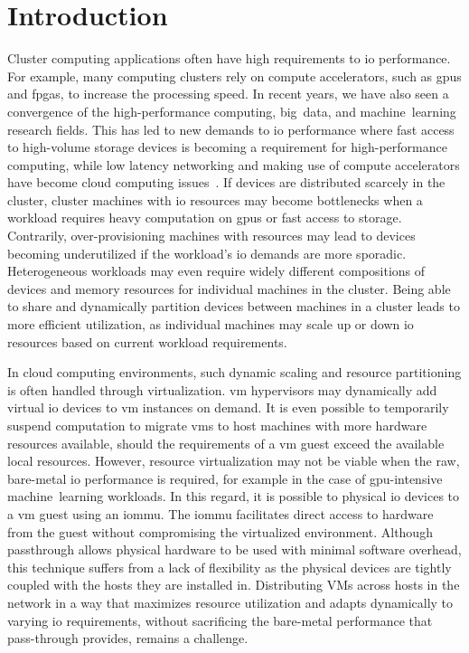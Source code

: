 \chapter{Introduction}\label{chapter:intro}
Cluster computing applications often have high requirements to \gls{io} performance.
%
For example, many computing clusters rely on compute accelerators, such as \glspl{gpu} and \glspl{fpga}, to increase the processing speed.
%
In recent years, we have also seen a convergence of the high-performance computing, big~data, and machine~learning research fields.
%
This has led to new demands to \gls{io} performance where fast access to high-volume storage devices is becoming a requirement for high-performance computing, while low latency networking and making use of compute accelerators have become cloud computing issues~\cite{Trivedi2011,Coates2013,Taherkordi2018}.
%
If devices are distributed scarcely in the cluster, cluster machines with \gls{io} resources may become bottlenecks when a workload requires heavy computation on \glspl{gpu} or fast access to storage.
%
Contrarily, over-provisioning machines with resources may lead to devices becoming underutilized if the workload's \gls{io} demands are more sporadic.
%
Heterogeneous workloads may even require widely different compositions of devices and memory resources for individual machines in the cluster.
%
Being able to share and dynamically partition devices between machines in a cluster leads to more efficient
utilization, as individual machines may scale up or down \gls{io} resources based on current workload requirements.



In cloud computing environments, such dynamic scaling and resource partitioning is often handled through virtualization. 
\Gls{vm} \glspl{hypervisor} may dynamically add virtual \gls{io} devices to \gls{vm} instances on demand.
%
It is even possible to temporarily suspend computation to migrate \glspl{vm} to \gls{host} machines with more hardware resources available, should the requirements of a \gls{vm} \gls{guest} exceed the available local resources.
%
However, resource virtualization may not be viable when the raw, bare-metal \gls{io} performance is required, for example in the case of \gls{gpu}-intensive machine~learning workloads.
%
In this regard, it is possible to  physical \gls{io} devices to a \gls{vm} \gls{guest} using an \gls{iommu}.
%
The \gls{iommu} facilitates direct access to hardware from the \gls{guest} without compromising the virtualized environment.
%
Although \gls{passthrough} allows physical hardware to be used with minimal software overhead, this technique suffers from a lack of flexibility as the physical devices are tightly coupled with the hosts they are installed in.
%
Distributing VMs across hosts in the network in a way that maximizes resource utilization and adapts dynamically to varying \gls{io} requirements, without sacrificing the bare-metal performance that pass-through provides, remains a challenge.



